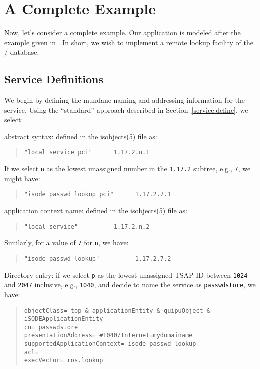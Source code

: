 
\chapter       {A Complete Example}\label{cook:example}
Now, let's consider a complete example.
Our application is modeled after the example given in \cite{Courier.BSD}.
In short,
we wish to implement a remote lookup facility of the \unix/ 
database.

\section	{Service Definitions}
We begin by defining the mundane naming and addressing information for the
service.
Using the ``standard'' approach described in Section~\ref{service:define},
we select:
\begin{describe}
\item[abstract syntax:]	defined in the \man isobjects(5) file as:
\begin{quote}\small\begin{verbatim}
"local service pci"      1.17.2.n.1
\end{verbatim}\end{quote}
If we select \verb"n" as the lowest unassigned number in the \verb"1.17.2"
subtree, e.g., \verb"7", we might have:
\begin{quote}\small\begin{verbatim}
"isode passwd lookup pci"      1.17.2.7.1
\end{verbatim}\end{quote}

\item[application context name:] defined in the \man isobjects(5) file as:
\begin{quote}\small\begin{verbatim}
"local service"          1.17.2.n.2
\end{verbatim}\end{quote}
Similarly, for a value of \verb"7" for \verb"n", we have:
\begin{quote}\small\begin{verbatim}
"isode passwd lookup"          1.17.2.7.2
\end{verbatim}\end{quote}

\item[Directory entry:]
if we select \verb"p" as the lowest unassigned TSAP ID between \verb"1024"
and \verb"2047" inclusive, e.g., \verb"1040", 
and decide to name the service as \verb"passwdstore",
we have:
\begin{quote}\small\begin{verbatim}
objectClass= top & applicationEntity & quipuObject & iSODEApplicationEntity
cn= passwdstore
presentationAddress= #1040/Internet=mydomainame
supportedApplicationContext= isode passwd lookup
acl=
execVector= ros.lookup
\end{verbatim}\end{quote}
\end{describe}


